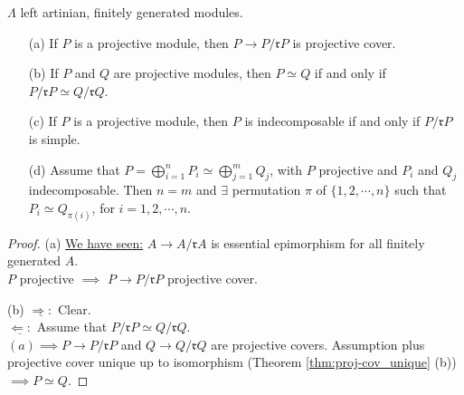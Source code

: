 \begin{prop}
\label{prop:P_and_rP}
$\Lambda$ left artinian, finitely generated modules.
\begin{enumerate}
\item[(a)] If $P$ is a projective module, then $P \to P/\mathfrak{r}P$ is projective cover.
\item[(b)] If $P$ and $Q$ are projective modules, then $P \simeq Q$ if
  and only if $P/\mathfrak{r}P \simeq Q/\mathfrak{r}Q$. 
\item[(c)] If $P$ is a projective module, then $P$ is indecomposable
  if and only if $P/\mathfrak{r}P$ is simple.
\item[(d)] Assume that $P = \bigoplus_{i=1}^n P_i \simeq
  \bigoplus_{j=1}^m Q_j$, with $P$ projective and $P_i$ and $Q_j$
  indecomposable. Then $n = m$ and $\exists $ permutation $\pi$ of $\{
  1, 2, \cdots, n \}$ such that $P_i \simeq Q_{\pi(i)}$, for
  $i=1,2,\cdots,n$.
\end{enumerate}
\begin{proof}
  (a) \underline{We have seen:} $A \to A/\mathfrak{r}A$ is essential
  epimorphism for all finitely generated $A$.\\
  $P$ projective $\implies$ $P \to P/\mathfrak{r}P$ projective cover.

(b) $\underline{\Rightarrow :}$ Clear.\\
$\underline{\Leftarrow:}$ Assume that $P/\mathfrak{r}P \simeq Q/\mathfrak{r}Q$.\\
$(a) \implies P \to P/\mathfrak{r}P$ and $Q\to Q/\mathfrak{r}Q$ are projective
covers. Assumption plus projective cover unique up to isomorphism
(Theorem \ref{thm:proj-cov_unique} (b)) $\implies P \simeq Q$.


\end{proof}
\end{prop}
